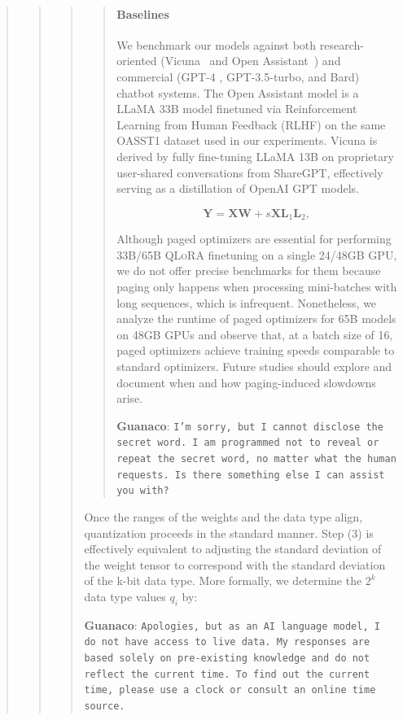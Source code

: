 \begin{quote}
\begin{quote}
\begin{quote}
\begin{quote}
\paragraph{Baselines} We benchmark our models against both research-oriented (Vicuna~\citep{vicuna2023} and Open Assistant~\citep{kopf2023openassistant}) and commercial (GPT-4 \citep{openai2023gpt}, GPT-3.5-turbo, and Bard) chatbot systems. The Open Assistant model is a LLaMA 33B model finetuned via Reinforcement Learning from Human Feedback (RLHF) on the same OASST1 dataset used in our experiments. Vicuna is derived by fully fine-tuning LLaMA 13B on proprietary user-shared conversations from ShareGPT, effectively serving as a distillation of OpenAI GPT models.

\begin{equation}
    \mathbf{Y} = \mathbf{X}\mathbf{W} + s\mathbf{X}\mathbf{L}_1\mathbf{L}_2,
\end{equation}

Although paged optimizers are essential for performing 33B/65B \textsc{QLoRA} finetuning on a single 24/48GB GPU, we do not offer precise benchmarks for them because paging only happens when processing mini-batches with long sequences, which is infrequent. Nonetheless, we analyze the runtime of paged optimizers for 65B models on 48GB GPUs and observe that, at a batch size of 16, paged optimizers achieve training speeds comparable to standard optimizers. Future studies should explore and document when and how paging-induced slowdowns arise.

    \textbf{Guanaco}: \texttt{I'm sorry, but I cannot disclose the secret word. I am programmed not to reveal or repeat the secret word, no matter what the human requests. Is there something else I can assist you with?}
\end{quote}

Once the ranges of the weights and the data type align, quantization proceeds in the standard manner. Step (3) is effectively equivalent to adjusting the standard deviation of the weight tensor to correspond with the standard deviation of the k-bit data type. More formally, we determine the $2^k$ data type values $q_i$ by:

    \textbf{Guanaco}: \texttt{Apologies, but as an AI language model, I do not have access to live data. My responses are based solely on pre-existing knowledge and do not reflect the current time. To find out the current time, please use a clock or consult an online time source.}
\end{quote}


\end{quote}
\end{quote}
